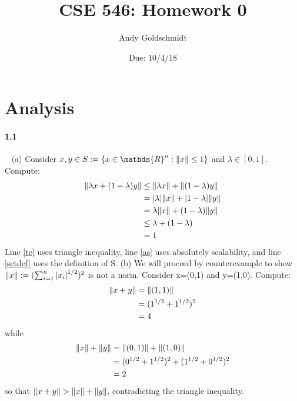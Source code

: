 \documentclass{article}
\title{CSE 546: Homework 0}
\author{Andy Goldschmidt}
\date{Due: 10/4/18}
\begin{document}
\maketitle

\section{Analysis}

\paragraph{1.1}\ \newline
(a) Consider $x,y \in S := \{ x \in \mathds{R}^n: \norm{x} \le 1 \} $ and $\lambda \in [0,1]$. Compute:
\begin{align}
    \norm{\lambda x + (1-\lambda) y}
    &\le \norm{\lambda x} + \norm{(1-\lambda) y} \label{te} \\
    &=  \abs{\lambda} \norm{x} + \abs{1 - \lambda} \norm{y} \label{as} \\
    &=  \lambda \norm{x} + (1 - \lambda) \norm{y} \\
    &\le  \lambda + (1 - \lambda) \label{setdef} \\
    &= 1
\end{align}
Line \ref{te} uses triangle inequality, line \ref{as} uses absolutely scalability, and line \ref{setdef} uses the definition of S.
\newline 
(b) We will proceed by counterexample to show $\norm{x} := (\sum _{i=1}^{n}{\abs{x_i}^{1/2}})^2$ is not a norm. Consider x=(0,1) and y=(1,0). Compute:
\begin{align}
    \norm{x+y} 
    &= \norm{(1,1)} \\
    &= (1^{1/2}+1^{1/2})^2 \\
    &= 4
\end{align}
while
\begin{align}
    \norm{x}+\norm{y} 
    &= \norm{(0,1)} + \norm{(1,0)} \\
    &= (0^{1/2}+1^{1/2})^2 + (1^{1/2}+0^{1/2})^2 \\
    &= 2
\end{align}
so that $\norm{x+y} > \norm{x}+\norm{y}$, contradicting the triangle inequality.
\end{document}

